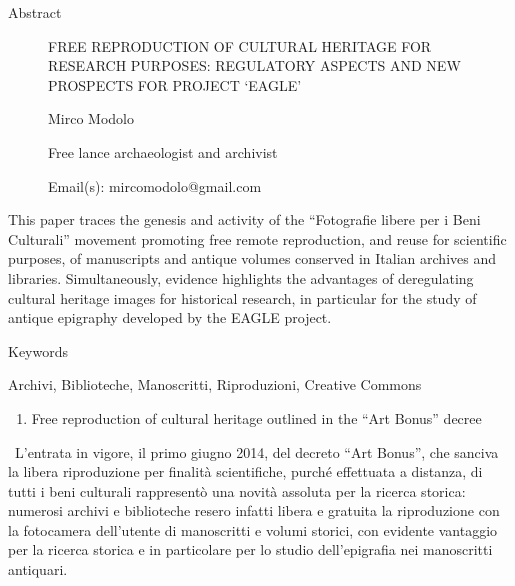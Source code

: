 \documentclass[amsthm,ebook]{saparticle}
\title{}
\author{Mirco Modolo}
\date{2015-11-20}
\begin{document}
Abstract

\begin{figure}
\centering
\begin{minipage}{10.901cm}
FREE REPRODUCTION OF CULTURAL HERITAGE FOR RESEARCH PURPOSES: REGULATORY ASPECTS AND NEW PROSPECTS FOR PROJECT
‘EAGLE’\newline


Mirco Modolo

Free lance archaeologist and archivist

Email(s): mircomodolo@gmail.com
\end{minipage}
\end{figure}
This paper traces the genesis and activity of the “Fotografie libere per i Beni Culturali” movement promoting free
remote reproduction, and reuse for scientific purposes, of manuscripts and antique volumes conserved in Italian
archives and libraries. Simultaneously, evidence highlights the advantages of deregulating cultural heritage images for
historical research, in particular for the study of antique epigraphy developed by the EAGLE project. \ 


\bigskip

Keywords

Archivi, Biblioteche, Manoscritti, Riproduzioni, Creative Commons


\bigskip


\bigskip


\bigskip


\bigskip


\bigskip


\bigskip


\bigskip


\bigskip


\bigskip


\bigskip


\bigskip


\bigskip


\bigskip


\bigskip

\begin{enumerate}
\item Free reproduction of cultural heritage outlined in the “Art Bonus” decree
\end{enumerate}
\ L’entrata in vigore, il primo giugno 2014, del decreto “Art Bonus”, che sanciva la libera riproduzione per finalità
scientifiche, purché effettuata a distanza, di tutti i beni culturali rappresentò una novità assoluta per la ricerca
storica: numerosi archivi e biblioteche resero infatti libera e gratuita la riproduzione con la fotocamera dell’utente
di manoscritti e volumi storici, con evidente vantaggio per la ricerca storica e in particolare per lo studio
dell’epigrafia nei manoscritti antiquari. 
\end{document}
